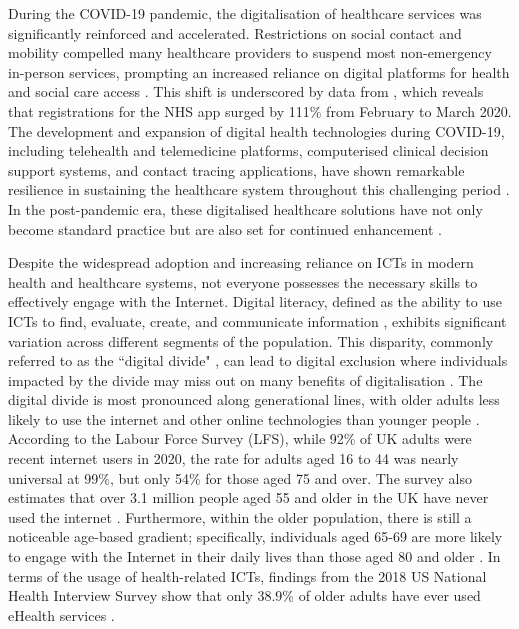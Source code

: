 During the COVID-19 pandemic, the digitalisation of healthcare services was significantly reinforced and accelerated. Restrictions on social contact and mobility compelled many healthcare providers to suspend most non-emergency in-person services, prompting an increased reliance on digital platforms for health and social care access \parencite{ramsetty_impact_2020}. This shift is underscored by data from \textcite{spanakis_digital_2021}, which reveals that registrations for the NHS app surged by 111\% from February to March 2020. The development and expansion of digital health technologies during COVID-19, including telehealth and telemedicine platforms, computerised clinical decision support systems, and contact tracing applications, have shown remarkable resilience in sustaining the healthcare system throughout this challenging period \parencite{pandit_smartphone_2022}. In the post-pandemic era, these digitalised healthcare solutions have not only become standard practice but are also set for continued enhancement \parencite{getachew_digital_2023}.

Despite the widespread adoption and increasing reliance on ICTs in modern health and healthcare systems, not everyone possesses the necessary skills to effectively engage with the Internet. Digital literacy, defined as the ability to use ICTs to find, evaluate, create, and communicate information \parencite{vankessel_digital_2022}, exhibits significant variation across different segments of the population. This disparity, commonly referred to as the ``digital divide" \parencite{bernhardt_health_2000,hall_digital_2015,makri_bridging_2019}, can lead to digital exclusion where individuals impacted by the divide may miss out on many benefits of digitalisation \parencite{spanakis_digital_2021}. The digital divide is most pronounced along generational lines, with older adults less likely to use the internet and other online technologies than younger people \parencite{smith_older_2014}. According to the Labour Force Survey (LFS), while 92\% of UK adults were recent internet users in 2020, the rate for adults aged 16 to 44 was nearly universal at 99\%, but only 54\% for those aged 75 and over. The survey also estimates that over 3.1 million people aged 55 and older in the UK have never used the internet \parencite{officefornationalstatistics_internet_2021}. Furthermore, within the older population, there is still a noticeable age-based gradient; specifically, individuals aged 65-69 are more likely to engage with the Internet in their daily lives than those aged 80 and older \parencite{anderson_tech_2017}. In terms of the usage of health-related ICTs, findings from the 2018 US National Health Interview Survey show that only 38.9\% of older adults have ever used eHealth services \parencite{he_factors_2022}.

